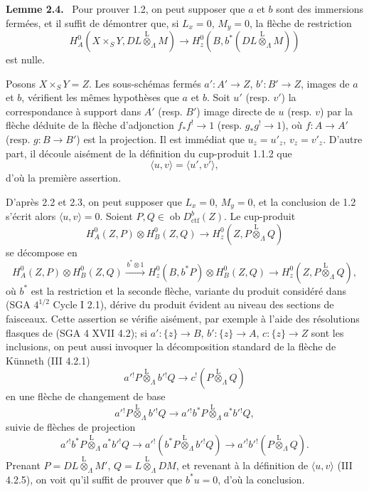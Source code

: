 \documentclass[11pt]{article}
\newenvironment{statement}[1]{\par\medskip\noindent\textbf{#1.}\ }{\par\medskip}
\providecommand{\lten}{\overset{\mathrm L}{\otimes}}
\providecommand{\Ob}{\operatorname{ob}}
\providecommand{\lten}{\overset{\mathrm L}{\otimes}}
\providecommand{\lten}{\overset{\mathrm L}{\otimes}}
\providecommand{\Ob}{\operatorname{ob}}
\providecommand{\lten}{\overset{\mathrm L}{\otimes}}
\providecommand{\lten}{\overset{\mathrm L}{\otimes}}
\providecommand{\Ob}{\operatorname{Ob}}
\providecommand{\lten}{\overset{\mathrm L}{\otimes}}
\begin{document}
\begin{statement}{Lemme 2.4}
Pour prouver 1.2, on peut supposer que $a$ et $b$ sont des immersions fermées, et il suffit de démontrer que, si $L_x=0$, $M_y=0$, la flèche de restriction
\begin{equation}
H_A^0(X\times_SY,DL\lten_{\Lambda}M)
 \longrightarrow H_z^0(B,b^*(DL\lten_{\Lambda}M))
\tag{2.4.1}
\end{equation}
est nulle.
\end{statement}

Posons $X\times_SY=Z$. Les sous-schémas fermés $a':A'\to Z$, $b':B'\to Z$, images de $a$ et $b$, vérifient les mêmes hypothèses que $a$ et $b$. Soit $u'$ (resp. $v'$) la correspondance à support dans $A'$ (resp. $B'$) image directe de $u$ (resp. $v$) par la flèche déduite de la flèche d'adjonction $f_*f^!\to 1$ (resp. $g_*g^!\to 1$), où $f:A\to A'$ (resp. $g:B\to B'$) est la projection. Il est immédiat que $u_z=u'_z$, $v_z=v'_z$. D'autre part, il découle aisément de la définition du cup-produit 1.1.2 que
\[
\langle u,v\rangle=\langle u',v'\rangle,
\]
d'où la première assertion.

D'après 2.2 et 2.3, on peut supposer que $L_x=0$, $M_y=0$, et la conclusion de 1.2 s'écrit alors $\langle u,v\rangle=0$. Soient $P,Q\in\Ob D_{\mathrm{ctf}}^b(Z)$. Le cup-produit
\[
H_A^0(Z,P)\otimes H_B^0(Z,Q)\longrightarrow H_z^0(Z,P\lten_{\Lambda}Q)
\]
se décompose en
\[
H_A^0(Z,P)\otimes H_B^0(Z,Q)
 \xrightarrow{\,b^*\otimes 1\,}
H_z^0(B,b^*P)\otimes H_B^0(Z,Q)
 \longrightarrow H_z^0(Z,P\lten_{\Lambda}Q),
\]
où $b^*$ est la restriction et la seconde flèche, variante du produit considéré dans (SGA $4^{1/2}$ Cycle I 2.1), dérive du produit évident au niveau des sections de faisceaux. Cette assertion se vérifie aisément, par exemple à l'aide des résolutions flasques de (SGA 4 XVII 4.2); si $a':\{z\}\to B$, $b':\{z\}\to A$, $c:\{z\}\to Z$ sont les inclusions, on peut aussi invoquer la décomposition standard de la flèche de Künneth (III 4.2.1)
\[
a'{}^!P\lten_{\Lambda} b'{}^!Q\longrightarrow c^!(P\lten_{\Lambda}Q)
\]
en une flèche de changement de base
\[
a'{}^!P\lten_{\Lambda} b'{}^!Q\longrightarrow a'{}^!b^*P\lten_{\Lambda} a^*b'{}^!Q,
\]
suivie de flèches de projection
\[
a'{}^!b^*P\lten_{\Lambda} a^*b'{}^!Q
 \longrightarrow a'{}^!(b^*P\lten_{\Lambda} b'{}^!Q)
 \longrightarrow a'{}^!b'{}^!(P\lten_{\Lambda}Q).
\]
Prenant $P=DL\lten_{\Lambda}M'$, $Q=L\lten_{\Lambda}DM$, et revenant à la définition de $\langle u,v\rangle$ (III 4.2.5), on voit qu'il suffit de prouver que $b^*u=0$, d'où la conclusion.
\end{document}
